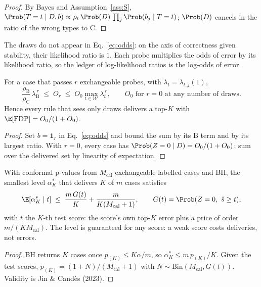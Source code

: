 \begin{proof}
By Bayes and Assumption~\ref{ass:S},
$\Prob(T = t \mid D, b) \propto \rho_t\, \Prob(D)\, \prod_j \Prob(b_j \mid T = t)$;
$\Prob(D)$ cancels in the ratio of the wrong types to $\mathrm{C}$.
\end{proof}

The draws do not appear in Eq.~\eqref{eq:odds}: on the axis of correctness given
stability, their likelihood ratio is $1$. Each probe multiplies the odds of error by its
likelihood ratio, so the ledger of log-likelihood ratios is the log-odds of error.

\begin{corollary}
\label{cor:odds}
For a case that passes $r$ exchangeable probes, with $\lambda_t = \lambda_{t,j}(1)$,
\[
  \frac{\rho_{\mathrm B}}{\rho_{\mathrm C}}\,\lambda_{\mathrm B}^{\,r}
  \;\le\; O_r \;\le\; O_0 \max_{t \in \mathcal{W}} \lambda_t^{\,r},
  \qquad O_0 \text{ for } r = 0 \text{ at any number of draws.}
\]
Hence every rule that sees only draws delivers a top-$K$ with
$\E[\mathrm{FDP}] = O_0/(1 + O_0)$.
\end{corollary}

\begin{proof}
Set $b = \mathbf{1}_r$ in Eq.~\eqref{eq:odds} and bound the sum by its $\mathrm{B}$ term
and by its largest ratio. With $r = 0$, every case has $\Prob(Z = 0 \mid D) =
O_0/(1 + O_0)$; sum over the delivered set by linearity of expectation.
\end{proof}

\begin{corollary}
\label{cor:price}
With conformal p-values from $M_{\mathrm{cal}}$ exchangeable labelled cases and BH,
the smallest level $\alpha^\ast_K$ that delivers $K$ of $m$ cases satisfies
\[
  \E[\alpha^\ast_K \mid t] \;\le\; \frac{m\,G(t)}{K} + \frac{m}{K (M_{\mathrm{cal}} + 1)},
  \qquad G(t) = \Prob(Z = 0,\ \hat s \ge t),
\]
with $t$ the $K$-th test score: the score's own top-$K$ error plus a price of order
$m/(K M_{\mathrm{cal}})$. The level is guaranteed for any score: a weak score costs
deliveries, not errors.
\end{corollary}

\begin{proof}
BH returns $K$ cases once $p_{(K)} \le K\alpha/m$, so $\alpha^\ast_K \le m\,p_{(K)}/K$.
Given the test scores, $p_{(K)} = (1 + N)/(M_{\mathrm{cal}} + 1)$ with
$N \sim \mathrm{Bin}(M_{\mathrm{cal}}, G(t))$. Validity is Jin \& Cand\`es (2023).
\end{proof}

